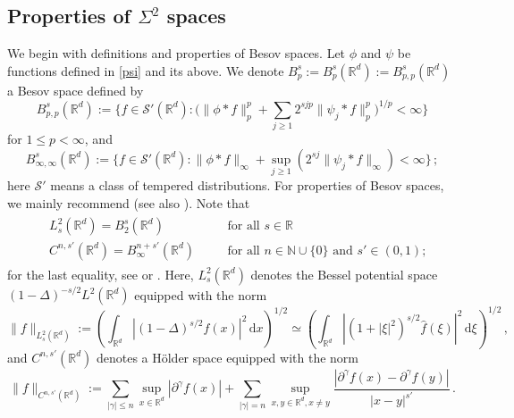 \documentclass[11pt]{amsart}
\theoremstyle{plain}
\theoremstyle{definition}
\theoremstyle{remark}
\numberwithin{equation}{section}
\newcommand{\bR}{\mathbb{R}}
\newcommand{\bN}{\mathbb{N}}
\newcommand{\dd}{\,\mathrm{d}}
\begin{document}
\subsection{Properties of $\Sigma^2$ spaces}
We begin with definitions and properties of Besov spaces.
Let $\phi$ and $\psi$ be functions defined in \eqref{psi} and its above.
We denote $B_{p}^s:=B_{p}^s(\mathbb R^d):=B_{p,p}^s(\bR^d)$ a Besov space defined by
\[
 B_{p,p}^s(\bR^d):= \Big\{f\in \mathscr S'(\mathbb R^d) : \Big(\| \phi \ast f\|_p^p+ \sum_{j\geq 1} 2^{sjp}\| \psi_j \ast f\|_p^p\Big)^{1/p} <\infty\Big\}
\]
for $1\leq p<\infty$, and 
\[
 B_{\infty,\infty}^s(\bR^d):= \Big\{f\in \mathscr S'(\mathbb R^d) : \| \phi \ast f\|_\infty+ \sup_{j\geq 1} \left(2^{sj}\| \psi_j \ast f\|_\infty\right) <\infty\Big\}\,;
\]
here $\mathscr S'$ means a class of tempered distributions.
For properties of Besov spaces, we mainly recommend \cite[Section 2.3]{Tri1978} (see also \cite{BerLof1976, FJW1956, Gra2014}).
Note that
\begin{align}\label{holder-besov}
\begin{alignedat}{2}
    &L^2_s(\mathbb R^d)=B_2^s(\mathbb R^d)\quad &&\text{for all $s\in\bR$}\\
    &C^{n,s'}(\mathbb R^d)=B_\infty^{n+s'}(\mathbb R^d) \quad&&\text{for all $n\in\bN\cup\{0\}$ and  $s'\in(0,1)$;}
\end{alignedat}
\end{align}
for the last equality, see \cite[Section 2.7]{Tri1978} or \cite[Remark 2.2.2]{Gra2014}.
Here, $L^2_s(\bR^d)$ denotes the Bessel potential space $(1-\Delta)^{-s/2}L^2(\bR^d)$ equipped with the norm
$$
\|f\|_{L^2_s(\mathbb{R}^d)}:=\left(\int_{\mathbb R^d}\left|(1-\Delta)^{s/2}f(x)\right|^2\dd x\right)^{1/2}\simeq \left(\int_{\mathbb{R}^d}\left|(1+|\xi|^2)^{s/2}\widehat{f}(\xi)\right|^2\dd \xi\right)^{1/2}\,,
$$
and 
$C^{n,s'}(\mathbb R^d)$ denotes a H\"older space equipped with the norm
$$
    \|f\|_{C^{n,s'}(\bR^d)}:=\sum_{|\gamma|\leq n}\sup_{x\in\bR^d}|\partial^\gamma f(x)|+\sum_{|\gamma|=n}\sup_{x,y\in\bR^d,x\neq y}\frac{|\partial^\gamma f(x)-\partial^\gamma f(y)|}{|x-y|^{s'}}\,.
$$
\end{document}
